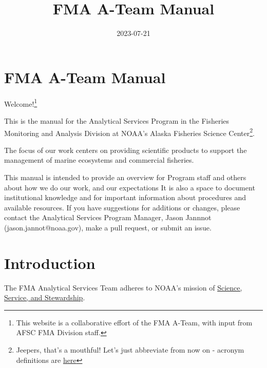 \documentclass[
  letterpaper,
  DIV=11,
  numbers=noendperiod]{scrreprt}
\title{FMA A-Team Manual}
\author{}
\date{2023-07-21}
\renewcommand*\contentsname{Table of contents}
\newcommand\contentsname{Table of contents}
\begin{document}
\maketitle
\ifdefined\Shaded\renewenvironment{Shaded}{\begin{tcolorbox}[breakable, frame hidden, interior hidden, boxrule=0pt, sharp corners, borderline west={3pt}{0pt}{shadecolor}, enhanced]}{\end{tcolorbox}}\fi

\renewcommand*\contentsname{Table of contents}
{
\hypersetup{linkcolor=}
\setcounter{tocdepth}{2}
\tableofcontents
}

\hypertarget{fma-a-team-manual}{%
\chapter{FMA A-Team Manual}\label{fma-a-team-manual}}

Welcome!\footnote{This website is a collaborative effort of the FMA
  A-Team, with input from AFSC FMA Division staff.}

This is the manual for the Analytical Services Program in the Fisheries
Monitoring and Analysis Division at NOAA's Alaska Fisheries Science
Center\footnote{Jeepers, that's a mouthful! Let's just abbreviate from
  now on - acronym definitions are
  \protect\hyperlink{sec-acronyms}{here}}.

The focus of our work centers on providing scientific products to
support the management of marine ecosystems and commercial fisheries.

This manual is intended to provide an overview for Program staff and
others about how we do our work, and our expectations It is also a space
to document institutional knowledge and for important information about
procedures and available resources. If you have suggestions for
additions or changes, please contact the Analytical Services Program
Manager, Jason Jannnot (jason.jannot@noaa.gov), make a pull request, or
submit an issue.


\hypertarget{intro}{%
\chapter{Introduction}\label{intro}}

The FMA Analytical Services Team adheres to NOAA's mission of
\href{https://www.noaa.gov/our-mission-and-vision}{Science, Service, and
Stewardship}.
\end{document}
